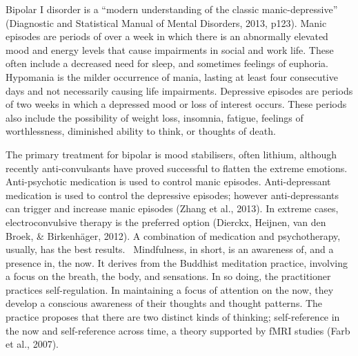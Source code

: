 
Bipolar I disorder is a “modern understanding of the classic manic-depressive” (Diagnostic and Statistical Manual of Mental Disorders, 2013, p123). Manic episodes are periods of over a week in which there is an abnormally elevated mood and energy levels that cause impairments in social and work life. These often include a decreased need for sleep, and sometimes feelings of euphoria. Hypomania is the milder occurrence of mania, lasting at least four consecutive days and not necessarily causing life impairments. Depressive episodes are periods of two weeks in which a depressed mood or loss of interest occurs. These periods also include the possibility of weight loss, insomnia, fatigue, feelings of worthlessness, diminished ability to think, or thoughts of death.



The primary treatment for bipolar is mood stabilisers, often lithium, although recently anti-convulsants have proved successful to flatten the extreme emotions. Anti-psychotic medication is used to control manic episodes. Anti-depressant medication is used to control the depressive episodes; however anti-depressants can trigger and increase manic episodes (Zhang et al., 2013). In extreme cases, electroconvulsive therapy is the preferred option (Dierckx, Heijnen, van den Broek, & Birkenhäger, 2012). A combination of medication and psychotherapy, usually, has the best results. 
Mindfulness, in short, is an awareness of, and a presence in, the now. It derives from the Buddhist meditation practice, involving a focus on the breath, the body, and sensations. In so doing, the practitioner practices self-regulation. In maintaining a focus of attention on the now, they develop a conscious awareness of their thoughts and thought patterns. The practice proposes that there are two distinct kinds of thinking; self-reference in the now and self-reference across time, a theory supported by fMRI studies (Farb et al., 2007). 

